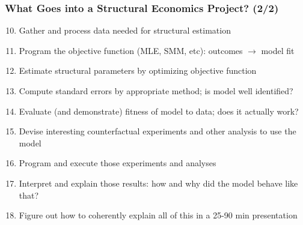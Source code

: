 \documentclass[aspectratio=169]{beamer}
\begin{document}
\begin{frame}
\frametitle{What Goes into a Structural Economics Project? (2/2)}
\begin{enumerate}
	\setcounter{enumi}{9}
	\item Gather and process data needed for structural estimation
	
	\item Program the objective function (MLE, SMM, etc): outcomes $\longrightarrow$ model fit
	
	\item <2->Estimate structural parameters by optimizing objective function
	
	\item <2->Compute standard errors by appropriate method; is model well identified?
	
	\item <3->Evaluate (and demonstrate) fitness of model to data; does it actually work?
	
	\item <4->Devise interesting counterfactual experiments and other analysis to use the model
	
	\item <5->Program and execute those experiments and analyses
	
	\item <5->Interpret and explain those results: how and why did the model behave like that?
	
	\item <6->Figure out how to coherently explain all of this in a 25-90 min presentation
\end{enumerate}
\end{frame}


\end{document}
